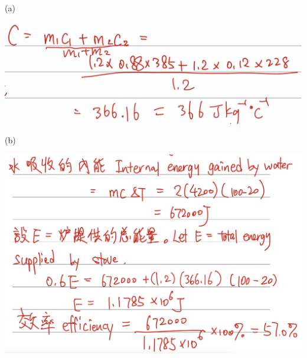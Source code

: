 {
}{
    \sol\par (a){\par \centering\includegraphics[width=\textwidth]{./img/ch2_shc_lq_2024-05-16-10-34-54.png}\par}
    \par (b){\par\centering\includegraphics[width=\textwidth]{./img/ch2_shc_lq_2024-05-16-10-35-08.png}\par}
}

